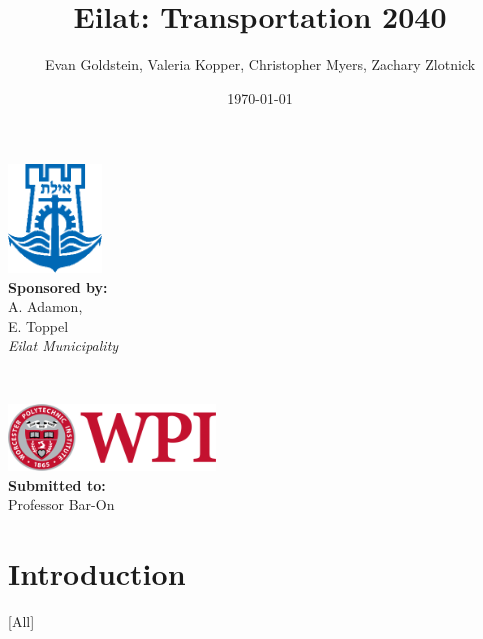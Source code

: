 \documentclass[12pt]{article}                         %
\title{Eilat: Transportation 2040}
\author{Evan Goldstein, Valeria Kopper, Christopher Myers, Zachary Zlotnick}
\date{\today}
\begin{document}
\maketitle

\vspace{12cm}
\begin{minipage}{0.5\textwidth}
    \begin{flushleft} \large
        \includegraphics[width=2.5cm]{eilat_logo.png} \\
        \textbf{Sponsored by:} \\
        A. Adamon, \\
        E. Toppel \\
        \textit{Eilat Municipality}
    \end{flushleft}
\end{minipage}
~
\begin{minipage}{0.4\textwidth}
    \begin{flushright} \large
        \includegraphics[width=5.5cm]{WPI_logo.png} \\
        \vspace{0.7cm}
        \textbf{Submitted to:}\\
        Professor Bar-On
        \vspace{1.5cm}
    \end{flushright}
\end{minipage}

\newpage

\renewcommand\abstractname{Summary} %

\tableofcontents
\newpage
\listofauthorships
\listoffigures
\newpage
{}
\doublespacing

\section{Introduction}[All]
\end{document}
